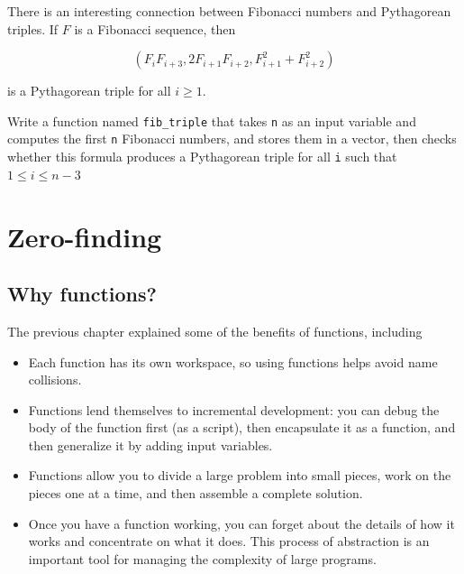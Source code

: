 \documentclass[
]{book}
\numberwithin{Answer}{chapter}
\numberwithin{Exercise}{chapter}
\begin{document}
\begin{ex}

There is an interesting connection between Fibonacci numbers and
Pythagorean triples.  If $F$ is a Fibonacci sequence, then

\begin{equation}
(F_i F_{i+3}, 2 F_{i+1} F_{i+2}, F_{i+1}^2 + F_{i+2}^2 )
\end{equation}

is a Pythagorean triple for all $i \ge 1$.

Write a function named {\tt fib\_triple} that
takes {\tt n} as an input variable and computes 
the first {\tt n} Fibonacci numbers, and stores them in a vector,
then checks whether this formula produces a Pythagorean triple for all {\tt i} such that $ 1 \leq i \leq n-3 $

\end{ex}



\chapter{Zero-finding}


\section{Why functions?}

The previous chapter explained some of the benefits of functions,
including

\begin{itemize}

\item Each function has its own workspace, so using functions helps
avoid name collisions.

\item Functions lend themselves to incremental development: you can
debug the body of the function first (as a script), then encapsulate
it as a function, and then generalize it by adding input variables.

\item Functions allow you to divide a large problem into small
pieces, work on the pieces one at a time, and then assemble a
complete solution.

\item Once you have a function working, you can forget about the
details of how it works and concentrate on what it does.  This
process of abstraction is an important tool for managing the
complexity of large programs.

\end{itemize}
\end{document}

